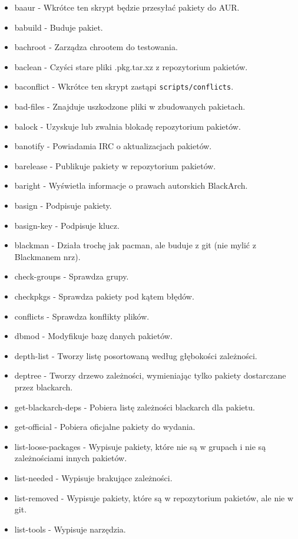 \documentclass[a4paper, oneside, 11pt]{book}
\begin{document}
\begin{itemize}
\item baaur - Wkrótce ten skrypt będzie przesyłać pakiety do AUR.
\item babuild - Buduje pakiet.
\item bachroot - Zarządza chrootem do testowania.
\item baclean - Czyści stare pliki .pkg.tar.xz z repozytorium pakietów.
\item baconflict - Wkrótce ten skrypt zastąpi \verb|scripts/conflicts|.
\item bad-files - Znajduje uszkodzone pliki w zbudowanych pakietach.
\item balock - Uzyskuje lub zwalnia blokadę repozytorium pakietów.
\item banotify - Powiadamia IRC o aktualizacjach pakietów.
\item barelease - Publikuje pakiety w repozytorium pakietów.
\item baright - Wyświetla informacje o prawach autorskich BlackArch.
\item basign - Podpisuje pakiety.
\item basign-key - Podpisuje klucz.
\item blackman - Działa trochę jak pacman, ale buduje z git (nie mylić z Blackmanem nrz).
\item check-groups - Sprawdza grupy.
\item checkpkgs - Sprawdza pakiety pod kątem błędów.
\item conflicts - Sprawdza konflikty plików.
\item dbmod - Modyfikuje bazę danych pakietów.
\item depth-list - Tworzy listę posortowaną według głębokości zależności.
\item deptree - Tworzy drzewo zależności, wymieniając tylko pakiety dostarczane przez blackarch.
\item get-blackarch-deps - Pobiera listę zależności blackarch dla pakietu.
\item get-official - Pobiera oficjalne pakiety do wydania.
\item list-loose-packages - Wypisuje pakiety, które nie są w grupach i nie są zależnościami innych pakietów.
\item list-needed - Wypisuje brakujące zależności.
\item list-removed - Wypisuje pakiety, które są w repozytorium pakietów, ale nie w git.
\item list-tools - Wypisuje narzędzia.

\end{itemize}
\end{document}
